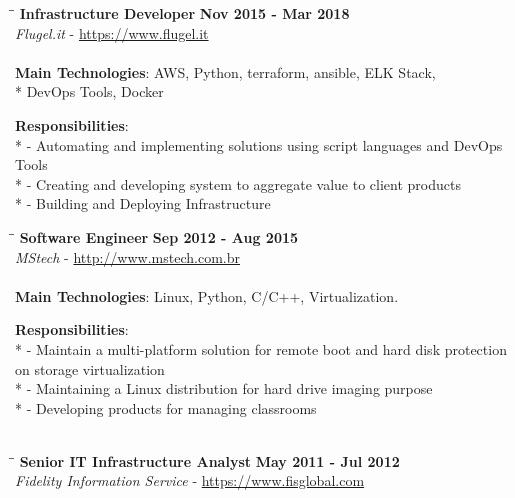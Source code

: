 \documentclass[margin]{res}
\begin{document}
\begin{resume}
\vspace{-0.1in}
\begin{tabbing}
  \hspace{2.3in}\= \hspace{1.7in}\= \kill %
  \textbf{Infrastructure Developer}    \>\>\textbf{Nov 2015 - Mar 2018}\\
  \textit{Flugel.it} - \url{https://www.flugel.it}\\\\
  \textbf{Main Technologies}: AWS, Python, terraform, ansible, ELK Stack,\\*
  DevOps Tools, Docker
\end{tabbing}\vspace{-20pt}      %
\vspace{2mm}\textbf{Responsibilities}: \\*
  - Automating and implementing solutions using script languages and DevOps Tools \\*
  - Creating and developing system to aggregate value to client products \\*
  - Building and Deploying Infrastructure\\

\vspace{-0.1in}
\begin{tabbing}
  \hspace{2.3in}\= \hspace{1.7in}\= \kill %
  \textbf{Software Engineer}    \>\>\textbf{Sep 2012 - Aug 2015}\\
  \textit{MStech} - \url{http://www.mstech.com.br}\\\\
  \textbf{Main Technologies}: Linux, Python, C/C++, Virtualization.
\end{tabbing}\vspace{-20pt}      %
\vspace{2mm}\textbf{Responsibilities}: \\*
  - Maintain a multi-platform solution for remote boot and hard disk protection
on storage virtualization \\*
  - Maintaining a Linux distribution for hard drive imaging purpose \\*
  - Developing products for managing classrooms\\
  \\

\vspace{-0.1in}
\begin{tabbing}
  \hspace{2.3in}\= \hspace{1.7in}\= \kill %
  \textbf{Senior IT Infrastructure Analyst}    \>\>\textbf{May 2011 - Jul 2012}\\
  \textit{Fidelity Information Service} - \url{https://www.fisglobal.com}\\\\
\end{tabbing}\vspace{-20pt}      %



\end{resume}
\end{document}
